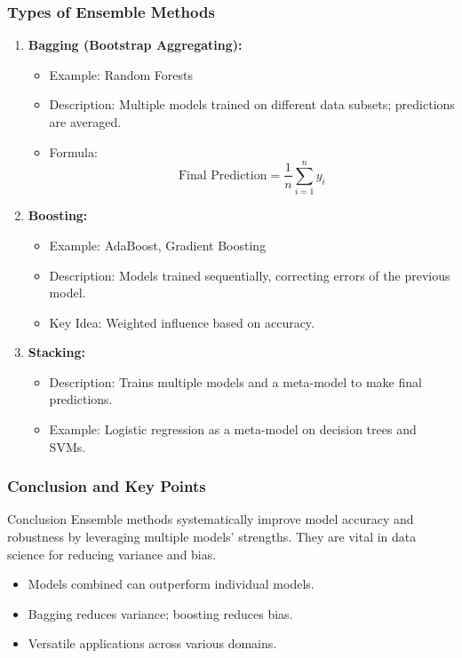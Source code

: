 \documentclass[aspectratio=169]{beamer}
\begin{document}
\begin{frame}[fragile]
    \frametitle{Types of Ensemble Methods}
    \begin{enumerate}
        \item \textbf{Bagging (Bootstrap Aggregating):}
        \begin{itemize}
            \item Example: Random Forests
            \item Description: Multiple models trained on different data subsets; predictions are averaged.
            \item Formula: 
            \begin{equation}
                \text{Final Prediction} = \frac{1}{n} \sum_{i=1}^{n} y_i
            \end{equation}
        \end{itemize}
        
        \item \textbf{Boosting:}
        \begin{itemize}
            \item Example: AdaBoost, Gradient Boosting
            \item Description: Models trained sequentially, correcting errors of the previous model.
            \item Key Idea: Weighted influence based on accuracy.
        \end{itemize}
        
        \item \textbf{Stacking:}
        \begin{itemize}
            \item Description: Trains multiple models and a meta-model to make final predictions.
            \item Example: Logistic regression as a meta-model on decision trees and SVMs.
        \end{itemize}
    \end{enumerate}
\end{frame}

\begin{frame}[fragile]
    \frametitle{Conclusion and Key Points}
    \begin{block}{Conclusion}
        Ensemble methods systematically improve model accuracy and robustness by leveraging multiple models' strengths. They are vital in data science for reducing variance and bias.
    \end{block}
    
    \begin{itemize}
        \item Models combined can outperform individual models.
        \item Bagging reduces variance; boosting reduces bias.
        \item Versatile applications across various domains.
    \end{itemize}
\end{frame}
\end{document}
